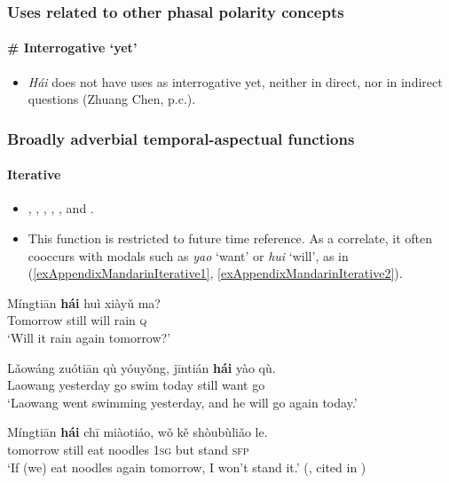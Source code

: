 \subsubsection{Uses related to other phasal polarity concepts}
\paragraph{\# Interrogative \lq yet\rq{}}
\begin{itemize}
	\item \textit{Hái} does not have uses as interrogative yet, neither in direct, nor in indirect questions (Zhuang Chen, p.c.).
\end{itemize}

\subsubsection{Broadly adverbial temporal-aspectual functions}
\paragraph{Iterative}
\label{appendixMandarinIterative}
\begin{itemize}
	\item \textcite[ch. 3.2]{Alleton1972}, \textcite[122–127]{Donazzan2008}, \textcite{JingSchmidtGries2009}, \textcite{Liu2000}, \textcite{Paris1988}, \textcite{Yeh1998} and \textcite{Zhang2017}.
	\item This function is restricted to future time reference. As a correlate, it often cooccurs with modals such as \textit{yao} \lq want' or \textit{hui} \lq will', as in (\ref{exAppendixMandarinIterative1}, \ref{exAppendixMandarinIterative2}).
\end{itemize}
	
\begin{exe}
	\ex\label{exAppendixMandarinIterative1}
	\gll Míngtiān	\textbf{hái}	huì	xiàyǔ	ma?\\
	Tomorrow still will rain \textsc{q}\\
	\glt \lq Will it rain again tomorrow?' \parencite[61]{HuangShi2016}

	\ex\label{exAppendixMandarinIterative2}
	\gll Lǎowáng	zuótiān	qù	yóuyǒng,	jīntián	\textbf{hái}	yào	qù.\\
	Laowang yesterday go swim today still want go\\
	\glt \lq Laowang went swimming yesterday, and he will go again today.\rq{ }\parencite[55]{Liu2000}
	
	\ex\label{exAppendixMandarinIterative3}
	\gll Míngtiān	\textbf{hái}	chī	miàotiáo,	wǒ	kě	shòubùliǎo	le.\\
	tomorrow still eat noodles 1\textsc{sg} but stand \textsc{sfp}\\
	\glt \lq If (we) eat noodles again tomorrow, I won’t stand it.\rq{ }(\cite[210]{Ma2000}, cited in \cite[34]{JingSchmidtGries2009})
\end{exe}

